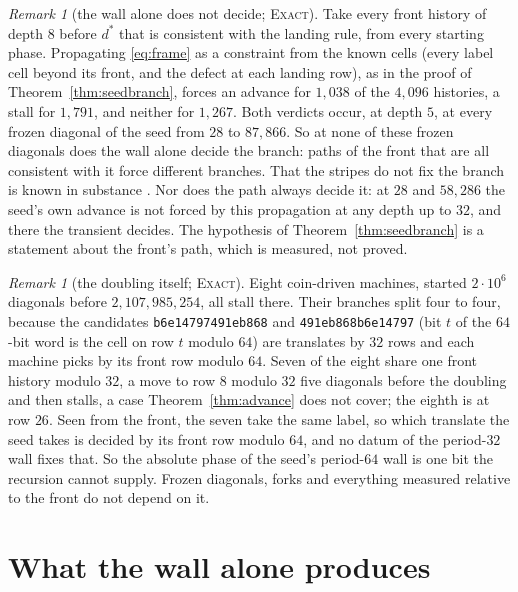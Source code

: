 \documentclass[11pt]{article}
\theoremstyle{definition}
\theoremstyle{remark}
\newtheorem{remark}[theorem]{Remark}
\newcommand{\EXACT}{\textsc{Exact}}
\newcommand{\dstar}{d^{*}}
\begin{document}
\begin{remark}[the wall alone does not decide; \EXACT]\label{rem:census}
Take every front history of depth $8$ before $\dstar$ that is consistent with the landing rule, from every starting phase. Propagating \eqref{eq:frame} as a constraint from the known cells (every label cell beyond its front, and the defect at each landing row), as in the proof of Theorem~\ref{thm:seedbranch}, forces an advance for $1{,}038$ of the $4{,}096$ histories, a stall for $1{,}791$, and neither for $1{,}267$. Both verdicts occur, at depth $5$, at every frozen diagonal of the seed from $28$ to $87{,}866$. So at none of these frozen diagonals does the wall alone decide the branch: paths of the front that are all consistent with it force different branches. That the stripes do not fix the branch is known in substance \cite{Pat,Rowland,Lania}. Nor does the path always decide it: at $28$ and $58{,}286$ the seed's own advance is not forced by this propagation at any depth up to $32$, and there the transient decides. The hypothesis of Theorem~\ref{thm:seedbranch} is a statement about the front's path, which is measured, not proved.
\end{remark}

\begin{remark}[the doubling itself; \EXACT]\label{rem:doubling}
Eight coin-driven machines, started $2\cdot10^6$ diagonals before $2{,}107{,}985{,}254$, all stall there. Their branches split four to four, because the candidates \texttt{b6e14797\allowbreak 491eb868} and \texttt{491eb868\allowbreak b6e14797} (bit $t$ of the $64$-bit word is the cell on row $t$ modulo $64$) are translates by $32$ rows and each machine picks by its front row modulo $64$. Seven of the eight share one front history modulo $32$, a move to row $8$ modulo $32$ five diagonals before the doubling and then stalls, a case Theorem~\ref{thm:advance} does not cover; the eighth is at row $26$. Seen from the front, the seven take the same label, so which translate the seed takes is decided by its front row modulo $64$, and no datum of the period-$32$ wall fixes that. So the absolute phase of the seed's period-$64$ wall is one bit the recursion cannot supply. Frozen diagonals, forks and everything measured relative to the front do not depend on it.
\end{remark}

\section{What the wall alone produces}
\end{document}
